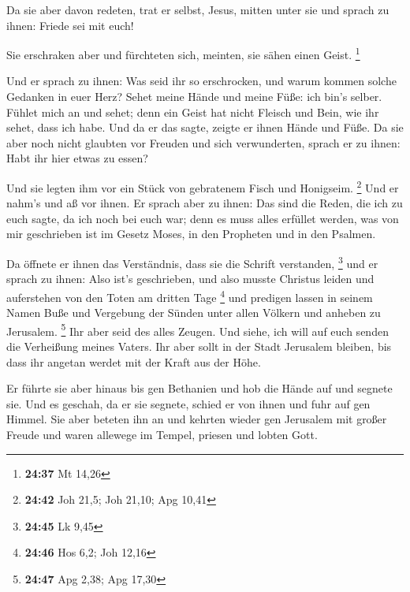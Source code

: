  Da sie aber davon redeten, trat er selbst, Jesus, mitten
unter sie und sprach zu ihnen: Friede sei mit euch!

 Sie erschraken aber und fürchteten sich, meinten, sie
sähen einen Geist. \footnote{\textbf{24:37} Mt 14,26}

 Und er sprach zu ihnen: Was seid ihr so erschrocken, und
warum kommen solche Gedanken in euer Herz?  Sehet meine
Hände und meine Füße: ich bin's selber. Fühlet mich an und sehet; denn
ein Geist hat nicht Fleisch und Bein, wie ihr sehet, dass ich habe.
 Und da er das sagte, zeigte er ihnen Hände und Füße.
 Da sie aber noch nicht glaubten vor Freuden und sich
verwunderten, sprach er zu ihnen: Habt ihr hier etwas zu essen?

 Und sie legten ihm vor ein Stück von gebratenem Fisch
und Honigseim. \footnote{\textbf{24:42} Joh 21,5; Joh 21,10; Apg 10,41}
 Und er nahm's und aß vor ihnen.  Er
sprach aber zu ihnen: Das sind die Reden, die ich zu euch sagte, da ich
noch bei euch war; denn es muss alles erfüllet werden, was von mir
geschrieben ist im Gesetz Moses, in den Propheten und in den Psalmen.

 Da öffnete er ihnen das Verständnis, dass sie die
Schrift verstanden, \footnote{\textbf{24:45} Lk 9,45} 
und er sprach zu ihnen: Also ist's geschrieben, und also musste Christus
leiden und auferstehen von den Toten am dritten Tage \footnote{\textbf{24:46}
  Hos 6,2; Joh 12,16}  und predigen lassen in seinem
Namen Buße und Vergebung der Sünden unter allen Völkern und anheben zu
Jerusalem. \footnote{\textbf{24:47} Apg 2,38; Apg 17,30} 
Ihr aber seid des alles Zeugen.  Und siehe, ich will auf
euch senden die Verheißung meines Vaters. Ihr aber sollt in der Stadt
Jerusalem bleiben, bis dass ihr angetan werdet mit der Kraft aus der
Höhe.

 Er führte sie aber hinaus bis gen Bethanien und hob die
Hände auf und segnete sie.  Und es geschah, da er sie
segnete, schied er von ihnen und fuhr auf gen Himmel. 
Sie aber beteten ihn an und kehrten wieder gen Jerusalem mit großer
Freude  und waren allewege im Tempel, priesen und lobten
Gott.
